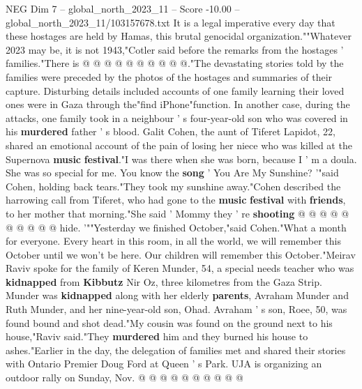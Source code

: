 \begin{textsample}{NEG Dim 7 – global\_north\_2023\_11 – Score -10.00 – global\_north\_2023\_11/103157678.txt}
It is a legal imperative every day that these hostages are held by Hamas, this brutal genocidal organization.""Whatever 2023 may be, it is not 1943,"Cotler said before the remarks from the hostages ' families."There is @ @ @ @ @ @ @ @ @ @."The devastating stories told by the families were preceded by the photos of the hostages and summaries of their capture.
Disturbing details included accounts of one family learning their loved ones were in Gaza through the"find iPhone"function.
In another case, during the attacks, one family took in a neighbour ' s four-year-old son who was covered in his \textbf{murdered} father ' s blood.
Galit Cohen, the aunt of Tiferet Lapidot, 22, shared an emotional account of the pain of losing her niece who was killed at the Supernova \textbf{music} \textbf{festival}."I was there when she was born, because I ' m a doula.
She was so special for me.
You know the \textbf{song} ' You Are My Sunshine? '"said Cohen, holding back tears."They took my sunshine away."Cohen described the harrowing call from Tiferet, who had gone to the \textbf{music} \textbf{festival} with \textbf{friends}, to her mother that morning."She said ' Mommy they ' re \textbf{shooting} @ @ @ @ @ @ @ @ @ @ hide. '""Yesterday we finished October,"said Cohen."What a month for everyone.
Every heart in this room, in all the world, we will remember this October until we won't be here.
Our children will remember this October."Meirav Raviv spoke for the family of Keren Munder, 54, a special needs teacher who was \textbf{kidnapped} from \textbf{Kibbutz} Nir Oz, three kilometres from the Gaza Strip.
Munder was \textbf{kidnapped} along with her elderly \textbf{parents}, Avraham Munder and Ruth Munder, and her nine-year-old son, Ohad.
Avraham ' s son, Roee, 50, was found bound and shot dead."My cousin was found on the ground next to his house,"Raviv said."They \textbf{murdered} him and they burned his house to ashes."Earlier in the day, the delegation of families met and shared their stories with Ontario Premier Doug Ford at Queen ' s Park.
UJA is organizing an outdoor rally on Sunday, Nov. @ @ @ @ @ @ @ @ @ @

\end{textsample}
